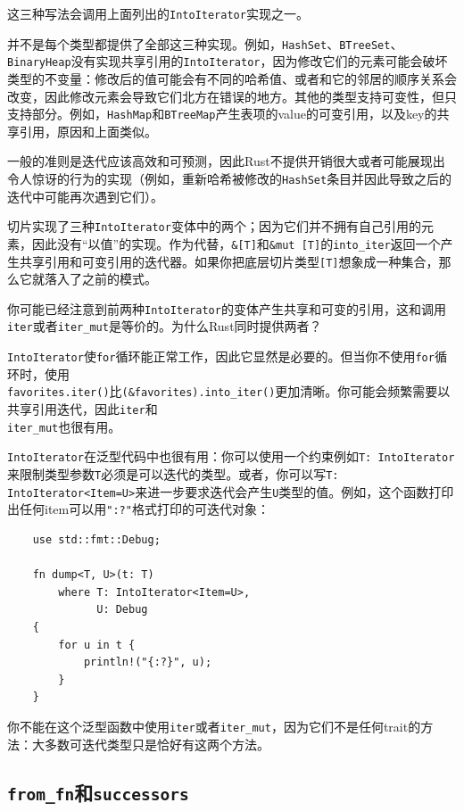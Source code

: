 这三种写法会调用上面列出的\texttt{IntoIterator}实现之一。

并不是每个类型都提供了全部这三种实现。例如，\texttt{HashSet}、\texttt{BTreeSet}、\texttt{BinaryHeap}没有实现共享引用的\texttt{IntoIterator}，因为修改它们的元素可能会破坏类型的不变量：修改后的值可能会有不同的哈希值、或者和它的邻居的顺序关系会改变，因此修改元素会导致它们北方在错误的地方。其他的类型支持可变性，但只支持部分。例如，\texttt{HashMap}和\texttt{BTreeMap}产生表项的value的可变引用，以及key的共享引用，原因和上面类似。

一般的准则是迭代应该高效和可预测，因此Rust不提供开销很大或者可能展现出令人惊讶的行为的实现（例如，重新哈希被修改的\texttt{HashSet}条目并因此导致之后的迭代中可能再次遇到它们）。

切片实现了三种\texttt{IntoIterator}变体中的两个；因为它们并不拥有自己引用的元素，因此没有“以值”的实现。作为代替，\texttt{\&[T]}和\texttt{\&mut [T]}的\texttt{into\_iter}返回一个产生共享引用和可变引用的迭代器。如果你把底层切片类型\texttt{[T]}想象成一种集合，那么它就落入了之前的模式。

你可能已经注意到前两种\texttt{IntoIterator}的变体产生共享和可变的引用，这和调用\texttt{iter}或者\texttt{iter\_mut}是等价的。为什么Rust同时提供两者？

\texttt{IntoIterator}使\texttt{for}循环能正常工作，因此它显然是必要的。但当你不使用\texttt{for}循环时，使用\\
\texttt{favorites.iter()}比\texttt{(\&favorites).into\_iter()}更加清晰。你可能会频繁需要以共享引用迭代，因此\texttt{iter}和\\
\texttt{iter\_mut}也很有用。

\texttt{IntoIterator}在泛型代码中也很有用：你可以使用一个约束例如\texttt{T: IntoIterator}来限制类型参数\texttt{T}必须是可以迭代的类型。或者，你可以写\texttt{T: IntoIterator<Item=U>}来进一步要求迭代会产生\texttt{U}类型的值。例如，这个函数打印出任何item可以用\texttt{"{:?}"}格式打印的可迭代对象：
\begin{verbatim}
    use std::fmt::Debug;

    fn dump<T, U>(t: T)
        where T: IntoIterator<Item=U>,
              U: Debug
    {
        for u in t {
            println!("{:?}", u);
        }
    }
\end{verbatim}
你不能在这个泛型函数中使用\texttt{iter}或者\texttt{iter\_mut}，因为它们不是任何trait的方法：大多数可迭代类型只是恰好有这两个方法。

\subsection{\texttt{from\_fn}和\texttt{successors}}

